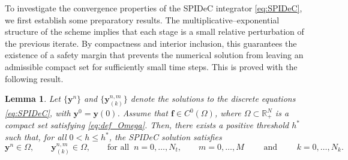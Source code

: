 \documentclass[a4paper,num-refs]{oup-contemporary-spidec}
\newtheorem{lemma}[theorem]{Lemma}
\begin{document}
To investigate the convergence properties of the SPIDeC integrator \eqref{eq:SPIDeC}, we first establish some
preparatory results. The multiplicative–exponential structure of the scheme implies that each stage is a small relative perturbation of the previous iterate. By compactness and interior inclusion, this guarantees the existence of a safety margin that prevents the numerical solution from leaving an admissible compact set for sufficiently small time steps. This is proved with the following result.

\begin{lemma}
    \label{lem:SPIDeC_invariant_set}
    Let $\{\bm{y}^{n}\}$ and $\{\bm{y}_{(k)}^{n,m}\}$ denote the solutions to the discrete equations \eqref{eq:SPIDeC}, with $\bm{y}^{0}=\bm{y}(0)$. Assume that $\bm f \in C^{0}(\Omega)$, where $\Omega \subset \mathbb{R}_{+}^{N}$ is a compact set satisfying \eqref{eq:def_Omega}. Then, there exists a positive threshold $h^*$ such that, for all $0<h\leq h^*$, the SPIDeC solution satisfies
        \begin{equation*}
            \bm y^n \in \Omega, \qquad \bm y^{n,m}_{(k)} \in \Omega, \qquad  \text{for all } \ n=0,\dots,N_t, \qquad m=0,\dots,M \qquad \text{ and } \qquad k=0,\dots,N_k.
        \end{equation*}
\end{lemma}
    
\end{document}

